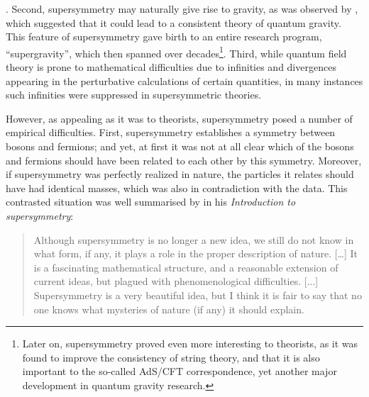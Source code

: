 \documentclass[smallextended]{svjour3}
\begin{document}
. Second, supersymmetry may naturally give rise to gravity, as was observed by \citet{Volkov1973}, which suggested that it could lead to a consistent theory of quantum gravity. This feature of supersymmetry gave birth to an entire research program, ``supergravity'', which then spanned over decades\footnote{Later on, supersymmetry proved even more interesting to theorists, as it was found to improve the consistency of string theory, and that it is also important to the so-called AdS/CFT correspondence, yet another major development in quantum gravity research.}. Third, while quantum field theory is prone to mathematical difficulties due to infinities and divergences appearing in the perturbative calculations of certain quantities, in many instances such infinities were suppressed in supersymmetric theories.%

However, as appealing as it was to theorists, supersymmetry posed a number of empirical difficulties. First, supersymmetry establishes a symmetry between bosons and fermions; and yet, at first it was not 
at all clear which of the bosons and fermions should have been related to each other by this symmetry. Moreover, if supersymmetry was perfectly realized in nature, the particles it relates should have had identical masses, which was also in contradiction with the data. 
This contrasted situation was well summarised by \citet{Witten1982de} in his \textit{Introduction to supersymmetry}: 

\begin{quote}
    Although supersymmetry is no longer a new idea, we still do not know in what form, if any, it plays a role in the proper description of nature. [\dots] It is a fascinating mathematical structure, and a reasonable extension of current ideas, but plagued with phenomenological difficulties. [...] Supersymmetry is a very beautiful idea, but I think it is fair to say that no one knows what mysteries of nature (if any) it should explain.
\end{quote}
\end{document}
